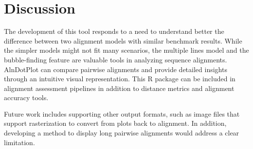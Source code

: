 \clearpage

\section{Discussion}

The development of this tool responds to a need to understand better the difference between two alignment models with similar benchmark results. While the simpler models might not fit many scenarios, the multiple lines model and the bubble-finding feature are valuable tools in analyzing sequence alignments. AlnDotPlot can compare pairwise alignments and provide detailed insights through an intuitive visual representation. This R package can be included in alignment assessment pipelines in addition to distance metrics and alignment accuracy tools.

Future work includes supporting other output formats, such as image files that support rasterization to convert from plots back to alignment. In addition, developing a method to display long pairwise alignments would address a clear limitation.

